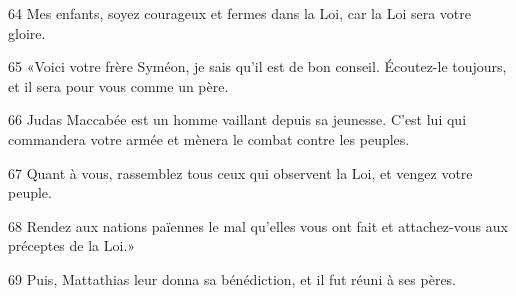 
64 Mes enfants, soyez courageux et fermes dans la Loi, car la Loi sera votre gloire.

65 «Voici votre frère Syméon, je sais qu’il est de bon conseil. Écoutez-le toujours, et il sera pour vous comme un père.

66 Judas Maccabée est un homme vaillant depuis sa jeunesse. C’est lui qui commandera votre armée et mènera le combat contre les peuples.

67 Quant à vous, rassemblez tous ceux qui observent la Loi, et vengez votre peuple.

68 Rendez aux nations païennes le mal qu’elles vous ont fait et attachez-vous aux préceptes de la Loi.»

69 Puis, Mattathias leur donna sa bénédiction, et il fut réuni à ses pères.
